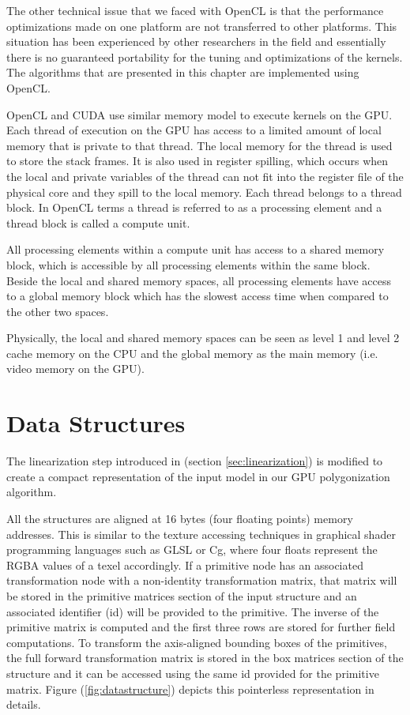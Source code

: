 The other technical issue that we faced with OpenCL is that the performance optimizations 
made on one platform are not transferred to other platforms. This situation has been experienced
by other researchers in the field and essentially there is no guaranteed portability for the 
tuning and optimizations of the kernels.
The algorithms that are presented in this chapter are implemented using OpenCL. 

OpenCL and CUDA use similar memory model to execute kernels on the GPU. Each thread of 
execution on the GPU has access to a limited amount of local memory that is private to that thread. 
The local memory for the thread is used to store the stack frames. It is also used in register spilling, 
which occurs when the local and private variables of the thread can not fit into the register file of the
physical core and they spill to the local memory. Each thread belongs to a thread block. In OpenCL terms 
a thread is referred to as a processing element and a thread block is called a compute unit. 

All processing elements within a compute unit has access to a shared memory block, which is 
accessible by all processing elements within the same block. Beside the local and shared memory
spaces, all processing elements have access to a global memory block which has the slowest access 
time when compared to the other two spaces. 

Physically, the local and shared memory spaces can be seen as level 1 and level 2 cache memory on the 
CPU and the global memory as the main memory (i.e. video memory on the GPU).



\section{Data Structures}
\label{sec:datastructure}
The \blob linearization step introduced in (section \ref{sec:linearization}) is modified to create a compact 
representation of the input model in our GPU polygonization algorithm. 

All the structures are aligned at 16 bytes (four floating points) memory addresses. This is similar to the texture 
accessing techniques in graphical shader programming languages such as GLSL or Cg, where four floats represent the 
RGBA values of a texel accordingly. If a primitive node has an associated transformation node with a non-identity 
transformation matrix, that matrix will be stored in the primitive matrices section of the input structure and an 
associated identifier (id) will be provided to the primitive. The inverse of the primitive matrix is computed 
and the first three rows are stored for further field computations. To transform the axis-aligned bounding 
boxes of the primitives, the full forward transformation matrix is stored in the box matrices section of 
the structure and it can be accessed using the same id provided for the primitive matrix.
Figure (\ref{fig:datastructure}) depicts this pointerless representation in details.

